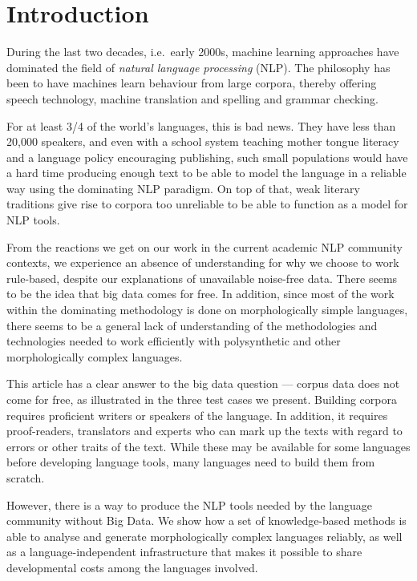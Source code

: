 \documentclass[free]{flammie}
\begin{document}
\section{Introduction}





During the last two decades, i.e.\ early 2000s, machine learning approaches have
dominated the field of \textit{natural language processing} (NLP). The
philosophy has been to have machines learn behaviour from large corpora, thereby
offering speech technology, machine translation and spelling and grammar
checking.

For at least 3/4 of the world's languages, this is bad news. They have less than
20,000 speakers, and even with a school system teaching mother tongue literacy
and a language policy encouraging publishing, such small populations would have
a hard time producing enough text to be able to model the language in a reliable
way using the dominating NLP paradigm. On top of that, weak literary traditions
give rise to corpora too unreliable to be able to function as a model for NLP
tools.

From the reactions we get on our work in the current academic NLP community
contexts, we experience an absence of understanding for why we choose to work
rule-based, despite our explanations of unavailable noise-free data. There seems
to be the idea that big data comes for free.  In addition, since most of the
work within the dominating methodology is done on morphologically simple
languages, there seems to be a general lack of understanding of the
methodologies and technologies needed to work efficiently with polysynthetic and
other morphologically complex languages.

This article has a clear answer to the big data question --- corpus data does
not come for free, as illustrated in the three test cases we present. Building
corpora requires proficient writers or speakers of the language. In addition, it
requires proof-readers, translators and experts who can mark up the texts with
regard to errors or other traits of the text. While these may be available for
some languages before developing language tools, many languages need to build
them from scratch.

However, there is a way to produce the NLP tools needed by the language
community without Big Data. We show how a set of knowledge-based methods is able
to analyse and generate morphologically complex languages reliably, as well as a
language-independent infrastructure that makes it possible to share
developmental costs among the languages involved.
\end{document}
